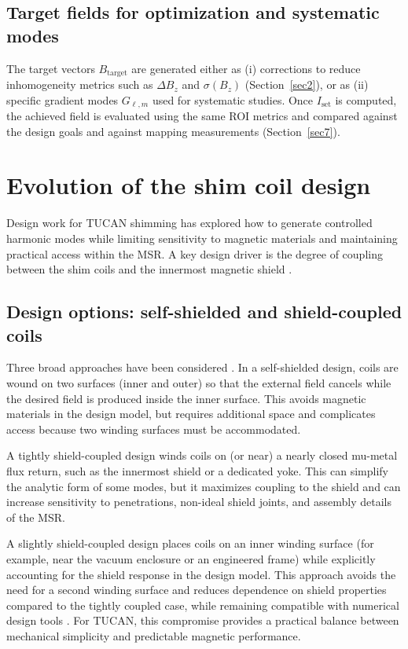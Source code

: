 \documentclass[preprint,12pt]{elsarticle}
\begin{document}
\subsection{Target fields for optimization and systematic modes}

The target vectors $B_{\mathrm{target}}$ are generated either as (i) corrections to reduce inhomogeneity metrics such as $\Delta B_z$ and $\sigma(B_z)$ (Section~\ref{sec2}), or as (ii) specific gradient modes $G_{\ell,m}$ used for systematic studies. Once $I_{\mathrm{set}}$ is computed, the achieved field is evaluated using the same ROI metrics and compared against the design goals and against mapping measurements (Section~\ref{sec7}).

\section{Evolution of the shim coil design}\label{sec5}

Design work for TUCAN shimming has explored how to generate controlled harmonic modes while limiting sensitivity to magnetic materials and maintaining practical access within the MSR. A key design driver is the degree of coupling between the shim coils and the innermost magnetic shield \cite{bib:martin2026options}.

\subsection{Design options: self-shielded and shield-coupled coils}

Three broad approaches have been considered \cite{bib:martin2026options}. In a self-shielded design, coils are wound on two surfaces (inner and outer) so that the external field cancels while the desired field is produced inside the inner surface. This avoids magnetic materials in the design model, but requires additional space and complicates access because two winding surfaces must be accommodated.

A tightly shield-coupled design winds coils on (or near) a nearly closed mu-metal flux return, such as the innermost shield or a dedicated yoke. This can simplify the analytic form of some modes, but it maximizes coupling to the shield and can increase sensitivity to penetrations, non-ideal shield joints, and assembly details of the MSR.

A slightly shield-coupled design places coils on an inner winding surface (for example, near the vacuum enclosure or an engineered frame) while explicitly accounting for the shield response in the design model. This approach avoids the need for a second winding surface and reduces dependence on shield properties compared to the tightly coupled case, while remaining compatible with numerical design tools \cite{bib:martin2026options,bib:comsol}. For TUCAN, this compromise provides a practical balance between mechanical simplicity and predictable magnetic performance.
\end{document}
